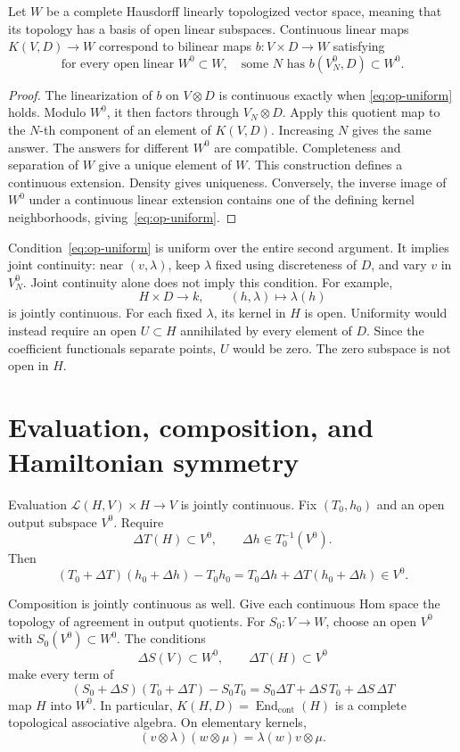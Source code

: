 \begin{proposition}
Let $W$ be a complete Hausdorff linearly topologized vector space,
meaning that its topology has a basis of open linear subspaces.
Continuous linear maps $K(V,D)\to W$ correspond to bilinear maps
$b:V\times D\to W$ satisfying
\begin{equation}
 \text{for every open linear }W^0\subset W,\quad
 \text{some }N\text{ has }b(V_N^0,D)\subset W^0.
 \label{eq:op-uniform}
\end{equation}
\end{proposition}
\begin{proof}
The linearization of $b$ on $V\otimes D$ is continuous exactly when
\eqref{eq:op-uniform} holds. Modulo $W^0$, it then factors through
$V_N\otimes D$. Apply this quotient map to the $N$-th component of
an element of $K(V,D)$. Increasing $N$ gives the same answer.
The answers for different $W^0$ are compatible. Completeness and
separation of $W$ give a unique element of $W$. This construction
defines a continuous extension. Density gives uniqueness. Conversely,
the inverse image of $W^0$ under a continuous linear extension contains
one of the defining kernel neighborhoods, giving~\eqref{eq:op-uniform}.
\end{proof}

Condition~\eqref{eq:op-uniform} is uniform over the entire second
argument. It implies joint continuity: near $(v,\lambda)$, keep
$\lambda$ fixed using discreteness of $D$, and vary $v$ in $V_N^0$.
Joint continuity alone does not imply this condition. For example,
\[
 H\times D\longrightarrow k,\qquad(h,\lambda)\longmapsto\lambda(h)
\]
is jointly continuous. For each fixed $\lambda$, its kernel in $H$
is open. Uniformity would instead require an open $U\subset H$
annihilated by every element of $D$. Since the coefficient functionals
separate points, $U$ would be zero. The zero subspace is not open in $H$.

\section{Evaluation, composition, and Hamiltonian symmetry}

Evaluation $\mathcal L(H,V)\times H\to V$ is jointly continuous.
Fix $(T_0,h_0)$ and an open output subspace $V^0$. Require
\[
 \Delta T(H)\subset V^0,\qquad
 \Delta h\in T_0^{-1}(V^0).
\]
Then
\[
 (T_0+\Delta T)(h_0+\Delta h)-T_0h_0
   =T_0\Delta h+\Delta T(h_0+\Delta h)\in V^0.
\]

Composition is jointly continuous as well. Give each continuous Hom
space the topology of agreement in output quotients. For
$S_0:V\to W$, choose an open $V^0$ with $S_0(V^0)\subset W^0$.
The conditions
\[
 \Delta S(V)\subset W^0,\qquad\Delta T(H)\subset V^0
\]
make every term of
\[
 (S_0+\Delta S)(T_0+\Delta T)-S_0T_0
 =S_0\Delta T+\Delta S\,T_0+\Delta S\,\Delta T
\]
map $H$ into $W^0$. In particular,
$K(H,D)=\operatorname{End}_{\mathrm{cont}}(H)$ is a complete
topological associative algebra. On elementary kernels,
\[
 (v\otimes\lambda)(w\otimes\mu)
       =\lambda(w)v\otimes\mu.
\]


